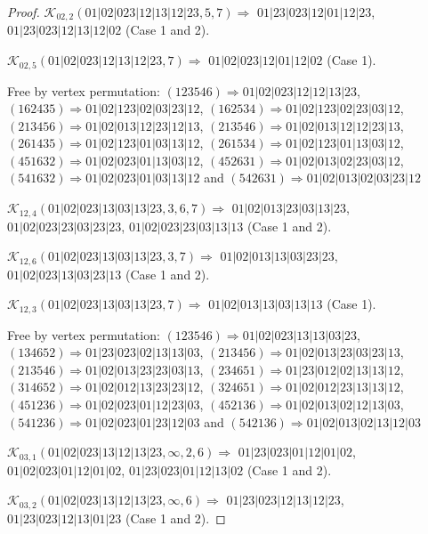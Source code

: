 \documentclass[12pt]{article}
\theoremstyle{plain}
\theoremstyle{definition}
\theoremstyle{remark}
\newcommand{\fancy}[1]{\mathcal{#1}}
\def\K{\fancy{K}}
\begin{document}
\begin{proof}
	$\K_{02,2}(01|02|023|12|13|12|23,5, 7)\Rightarrow $ $01|23|023|12|01|12|23$, $01|23|023|12|13|12|02$ (Case 1 and 2).
	
	$\K_{02,5}(01|02|023|12|13|12|23,7)\Rightarrow $ $01|02|023|12|01|12|02$ (Case 1).
	
	
	
	Free by vertex permutation: $(1 2 3 5 4 6)\Rightarrow 01|02|023|12|12|13|23$, $(1 6 2 4 3 5)\Rightarrow 01|02|123|02|03|23|12$, $(1 6 2 5 3 4)\Rightarrow 01|02|123|02|23|03|12$, $(2 1 3 4 5 6)\Rightarrow 01|02|013|12|23|12|13$, $(2 1 3 5 4 6)\Rightarrow 01|02|013|12|12|23|13$, $(2 6 1 4 3 5)\Rightarrow 01|02|123|01|03|13|12$, $(2 6 1 5 3 4)\Rightarrow 01|02|123|01|13|03|12$, $(4 5 1 6 3 2)\Rightarrow 01|02|023|01|13|03|12$, $(4 5 2 6 3 1)\Rightarrow 01|02|013|02|23|03|12$, $(5 4 1 6 3 2)\Rightarrow 01|02|023|01|03|13|12$ and $(5 4 2 6 3 1)\Rightarrow 01|02|013|02|03|23|12$
	
	
	
	\bigskip
	
	$\K_{12,4}(01|02|023|13|03|13|23,3, 6, 7)\Rightarrow $ $01|02|013|23|03|13|23$, $01|02|023|23|03|23|23$, $01|02|023|23|03|13|13$ (Case 1 and 2).
	
	$\K_{12,6}(01|02|023|13|03|13|23,3, 7)\Rightarrow $ $01|02|013|13|03|23|23$, $01|02|023|13|03|23|13$ (Case 1 and 2).
	
	$\K_{12,3}(01|02|023|13|03|13|23,7)\Rightarrow $ $01|02|013|13|03|13|13$ (Case 1).
	
	
	
	Free by vertex permutation: $(1 2 3 5 4 6)\Rightarrow 01|02|023|13|13|03|23$, $(1 3 4 6 5 2)\Rightarrow 01|23|023|02|13|13|03$, $(2 1 3 4 5 6)\Rightarrow 01|02|013|23|03|23|13$, $(2 1 3 5 4 6)\Rightarrow 01|02|013|23|23|03|13$, $(2 3 4 6 5 1)\Rightarrow 01|23|012|02|13|13|12$, $(3 1 4 6 5 2)\Rightarrow 01|02|012|13|23|23|12$, $(3 2 4 6 5 1)\Rightarrow 01|02|012|23|13|13|12$, $(4 5 1 2 3 6)\Rightarrow 01|02|023|01|12|23|03$, $(4 5 2 1 3 6)\Rightarrow 01|02|013|02|12|13|03$, $(5 4 1 2 3 6)\Rightarrow 01|02|023|01|23|12|03$ and $(5 4 2 1 3 6)\Rightarrow 01|02|013|02|13|12|03$
	
	
	
	\bigskip
	
	$\K_{03,1}(01|02|023|13|12|13|23,\infty,2, 6)\Rightarrow $ $01|23|023|01|12|01|02$, $01|02|023|01|12|01|02$, $01|23|023|01|12|13|02$ (Case 1 and 2).
	
	$\K_{03,2}(01|02|023|13|12|13|23,\infty,6)\Rightarrow $ $01|23|023|12|13|12|23$, $01|23|023|12|13|01|23$ (Case 1 and 2).
	

\end{proof}
\end{document}
